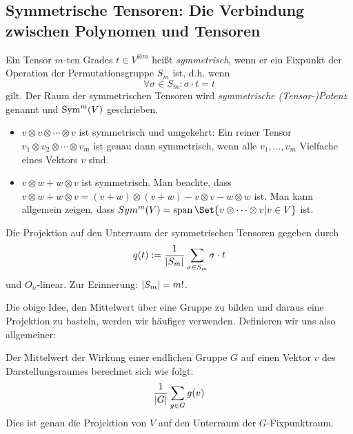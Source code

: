 \subsection{Symmetrische Tensoren: Die Verbindung zwischen Polynomen und Tensoren}

\begin{definition}\label{symmetrische_tensoren:def}
Ein Tensor $m$-ten Grades $t\in V^{\otimes m}$ heißt \emph{symmetrisch}, wenn er ein Fixpunkt der Operation der Permutationsgruppe $S_m$ ist, d.h. wenn
\[\forall \sigma\in S_m: \sigma\cdot t = t\]
gilt. Der Raum der symmetrischen Tensoren wird \emph{symmetrische (Tensor-)Potenz} genannt und $\operatorname{Sym}^m(V)$ geschrieben.
\end{definition}

\begin{example}
\begin{itemize}
\item $v\otimes v\otimes \cdots\otimes v$ ist symmetrisch und umgekehrt: Ein reiner Tensor $v_1\otimes v_2\otimes\cdots\otimes v_m$ ist genau dann symmetrisch, wenn alle $v_1,\ldots, v_m$ Vielfache eines Vektors $v$ sind.
\item $v\otimes w + w\otimes v$ ist symmetrisch. Man beachte, dass $v\otimes w + w\otimes v = (v+w)\otimes(v+w) - v\otimes v - w\otimes w$ ist. Man kann allgemein zeigen, dass $Sym^m(V) = \operatorname{span}\Set{v\otimes\cdots\otimes v | v\in V}$ ist.
\end{itemize}
\end{example}

\begin{lemma}[Mittelwerttrick]\label{symmetrische_tensoren:projektion}
Die Projektion auf den Unterraum der symmetrischen Tensoren gegeben durch
\[q(t) := \frac{1}{\lvert S_m\rvert} \sum_{\sigma\in S_m} \sigma\cdot t\]
und $O_n$-linear. Zur Erinnerung: $\lvert S_m\rvert = m!$.
\end{lemma}
Die obige Idee, den Mittelwert über eine Gruppe zu bilden und daraus eine Projektion zu basteln, werden wir häufiger verwenden. Definieren wir uns also allgemeiner:
\begin{definition}
	Der Mittelwert der Wirkung einer endlichen Gruppe $G$ auf einen Vektor $v$ des Darstellungsraumes berechnet sich wie folgt:
	\[
		\frac{1}{\lvert G\rvert} \sum_{g\in G} g(v)
	\]
	Dies ist genau die Projektion von $V$ auf den Unterraum der $G$-Fixpunktraum.
\end{definition}

